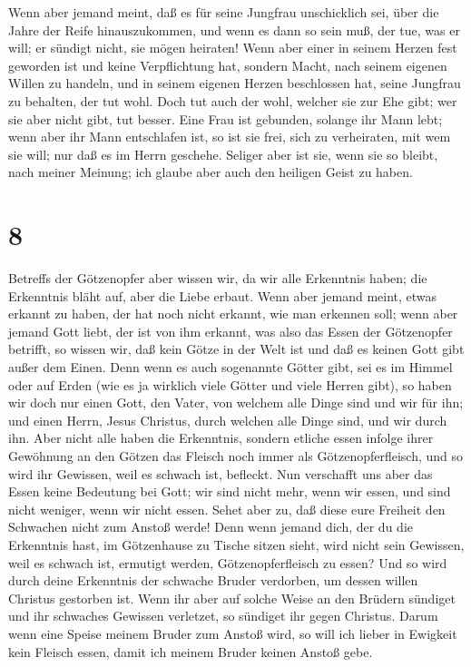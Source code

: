  Wenn aber jemand meint, daß es für seine Jungfrau
unschicklich sei, über die Jahre der Reife hinauszukommen, und wenn es
dann so sein muß, der tue, was er will; er sündigt nicht, sie mögen
heiraten!  Wenn aber einer in seinem Herzen fest geworden
ist und keine Verpflichtung hat, sondern Macht, nach seinem eigenen
Willen zu handeln, und in seinem eigenen Herzen beschlossen hat, seine
Jungfrau zu behalten, der tut wohl.  Doch tut auch der
wohl, welcher sie zur Ehe gibt; wer sie aber nicht gibt, tut besser.
 Eine Frau ist gebunden, solange ihr Mann lebt; wenn aber
ihr Mann entschlafen ist, so ist sie frei, sich zu verheiraten, mit wem
sie will; nur daß es im Herrn geschehe.  Seliger aber ist
sie, wenn sie so bleibt, nach meiner Meinung; ich glaube aber auch den
heiligen Geist zu haben.

\hypertarget{section-7}{%
\section{8}\label{section-7}}

 Betreffs der Götzenopfer aber wissen wir, da wir alle
Erkenntnis haben; die Erkenntnis bläht auf, aber die Liebe erbaut.
 Wenn aber jemand meint, etwas erkannt zu haben, der hat
noch nicht erkannt, wie man erkennen soll;  wenn aber
jemand Gott liebt, der ist von ihm erkannt,  was also das
Essen der Götzenopfer betrifft, so wissen wir, daß kein Götze in der
Welt ist und daß es keinen Gott gibt außer dem Einen. 
Denn wenn es auch sogenannte Götter gibt, sei es im Himmel oder auf
Erden (wie es ja wirklich viele Götter und viele Herren gibt),
 so haben wir doch nur einen Gott, den Vater, von welchem
alle Dinge sind und wir für ihn; und einen Herrn, Jesus Christus, durch
welchen alle Dinge sind, und wir durch ihn.  Aber nicht
alle haben die Erkenntnis, sondern etliche essen infolge ihrer Gewöhnung
an den Götzen das Fleisch noch immer als Götzenopferfleisch, und so wird
ihr Gewissen, weil es schwach ist, befleckt.  Nun
verschafft uns aber das Essen keine Bedeutung bei Gott; wir sind nicht
mehr, wenn wir essen, und sind nicht weniger, wenn wir nicht essen.
 Sehet aber zu, daß diese eure Freiheit den Schwachen
nicht zum Anstoß werde!  Denn wenn jemand dich, der du
die Erkenntnis hast, im Götzenhause zu Tische sitzen sieht, wird nicht
sein Gewissen, weil es schwach ist, ermutigt werden, Götzenopferfleisch
zu essen?  Und so wird durch deine Erkenntnis der
schwache Bruder verdorben, um dessen willen Christus gestorben ist.
 Wenn ihr aber auf solche Weise an den Brüdern sündiget
und ihr schwaches Gewissen verletzet, so sündiget ihr gegen Christus.
 Darum wenn eine Speise meinem Bruder zum Anstoß wird, so
will ich lieber in Ewigkeit kein Fleisch essen, damit ich meinem Bruder
keinen Anstoß gebe.

